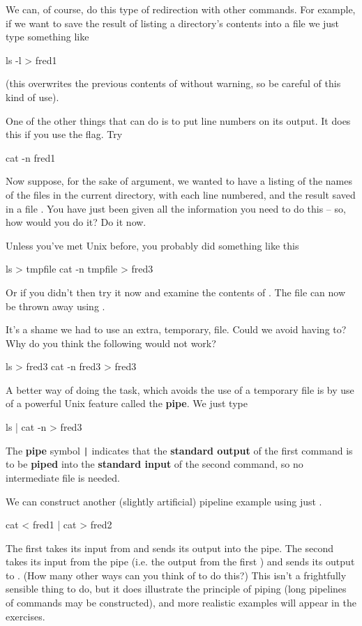We can, of course, do this type of redirection with other
commands. For example, if we want to save the result of listing a
directory's contents into a file we just type something like
\begin{ttoutenv}
ls -l > fred1
\end{ttoutenv}
(this overwrites the previous contents of  without
warning, so be careful of this kind of use).

One of the other things that  can do is to put line
numbers on its output. It does this if you use the 
flag. Try
\begin{ttoutenv}
cat -n fred1
\end{ttoutenv}
Now suppose, for the sake of argument, we wanted to have a listing of the
names of the
files in the current directory, with each line numbered, and the result
saved in a file . You have just been given all the
information you need to do this -- so, how would you do it? Do it now.

Unless you've met Unix before, you probably did something like this
\begin{ttoutenv}
ls > tmpfile 
cat -n tmpfile > fred3
\end{ttoutenv}
Or if you didn't then try it now and examine the contents of
. The file  can now be thrown away using
.

It's a shame we had to use an extra, temporary, file. Could we avoid
having to? Why do you think the following would not work?
\begin{ttoutenv}
ls > fred3 
cat -n fred3 > fred3
\end{ttoutenv}

A better way of doing the task, which avoids the use of a temporary file
is by use of a powerful Unix feature called the \textbf{pipe}. We just type
\begin{ttoutenv}
ls | cat -n > fred3
\end{ttoutenv}
The \textbf{pipe} symbol \verb+|+ indicates that the \textbf{standard
output} of the first command is to be \textbf{piped} into the
\textbf{standard input} of the second command, so no intermediate file
is needed.

We can construct another (slightly artificial) pipeline example using
just .

\begin{ttoutenv}
cat < fred1 | cat > fred2
\end{ttoutenv}
The first  takes its input from
 and sends its output into the pipe. The second
 takes its input from the pipe (i.e. the output from the
first ) and sends its output to . (How many
other ways can you think of to do this?)  This isn't a frightfully sensible
thing to do, but it does illustrate the principle of piping (long
pipelines of commands may be constructed), and more realistic examples
will appear in the exercises.


